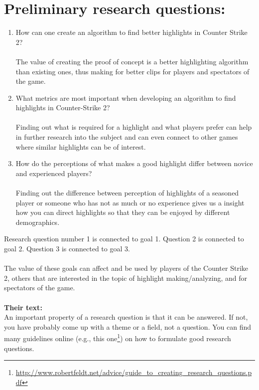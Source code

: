 \documentclass[a4paper,twoside]{bth}
\begin{document}
\section{Preliminary research questions:}
\normalsize
\begin{enumerate}[label=RQ\arabic*., leftmargin=*]
    \item How can one create an algorithm to find better highlights in Counter Strike 2? \\\\
    The value of creating the proof of concept is a better highlighting algorithm than existing ones, thus making for better clips for players and spectators of the game. 
    \item What metrics are most important when developing an algorithm to find highlights in Counter-Strike 2? \\\\
    Finding out what is required for a highlight and what players prefer can help in further research into the subject and can even connect to other games where similar highlights can be of interest.
    \item How do the perceptions of what makes a good highlight differ between novice and experienced players?\\\\
    Finding out the difference between perception of highlights of a seasoned player or someone who has not as much or no experience gives us a insight how you can direct highlights so that they can be enjoyed by different demographics. 
    
\end{enumerate}
Research question number 1 is connected to goal 1. Question 2 is connected to goal 2. Question 3 is connected to goal 3.\\\\
The value of these goals can affect and be used by players of the Counter Strike 2, others that are interested in the topic of highlight making/analyzing, and for spectators of the game.\\\\

\textbf{Their text:}\\
An important property of a research question is that it can be answered. If not, you have probably come up with a theme or a field, not a question. You can find many guidelines online (e.g., this one\footnote{\url{http://www.robertfeldt.net/advice/guide_to_creating_research_questions.pdf}}) on how to formulate good research questions.
\end{document}
